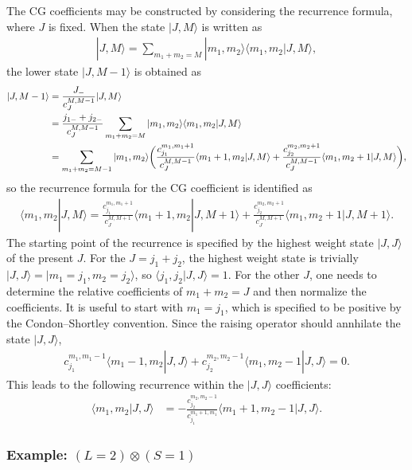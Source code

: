 \documentclass[amsmath,amssymb,prc,aps]{revtex4-2}
\newcommand{\hmath}[1]{\texorpdfstring{$#1$}{#1}}
\begin{document}
The CG coefficients may be constructed by considering the recurrence formula,
where $J$ is fixed.  When the state $|J, M\rangle$ is written as
\begin{align}
  |J, M\rangle = \sum_{m_1+m_2=M} |m_1, m_2\rangle\langle m_1,m_2|J,M\rangle,
\end{align}
the lower state $|J, M-1\rangle$ is obtained as
\begin{align}
  |J, M-1\rangle
    &= \frac{J_-}{c_{J}^{M,M-1}}|J,M\rangle \notag \\
    &= \frac{j_{1-} + j_{2-}}{c_{J}^{M,M-1}} \sum_{m_1+m_2=M} |m_1, m_2\rangle\langle m_1,m_2|J,M\rangle \notag \\
    &= \sum_{m_1+m_2=M-1} |m_1, m_2\rangle
      \biggl(\frac{c_{j_1}^{m_1,m_1+1}}{{c_{J}^{M,M-1}}}\langle m_1+1,m_2|J,M\rangle
      + \frac{c_{j_2}^{m_2,m_2+1}}{{c_{J}^{M,M-1}}}\langle m_1,m_2+1|J,M\rangle\biggr),
\end{align}
so the recurrence formula for the CG coefficient is identified as
\begin{align}
  \langle m_1,m_2|J,M\rangle =
  \frac{c_{j_1}^{m_1,m_1+1}}{{c_{J}^{M,M+1}}}\langle m_1+1,m_2|J,M+1\rangle
      + \frac{c_{j_2}^{m_2,m_2+1}}{{c_{J}^{M,M+1}}}\langle m_1,m_2+1|J,M+1\rangle.
\end{align}
The starting point of the recurrence is specified by the highest weight state
$|J,J\rangle$ of the present $J$.  For the $J=j_1+j_2$, the highest weight
state is trivially $|J,J\rangle = |m_1=j_1,m_2=j_2\rangle$, so $\langle
j_1,j_2|J,J\rangle = 1$.  For the other $J$, one needs to determine the
relative coefficients of $m_1+m_2=J$ and then normalize the coefficients.  It
is useful to start with $m_1=j_1$, which is specified to be positive by the
Condon--Shortley convention.  Since the raising operator should annhilate the
state $|J,J\rangle$,
\begin{align}
  c_{j_1}^{m_1,m_1-1} \langle m_1-1, m_2 | J, J\rangle
  + c_{j_2}^{m_2,m_2-1} \langle m_1, m_2-1 | J, J\rangle = 0.
\end{align}
This leads to the following recurrence within the $|J,J\rangle$ coefficients:
\begin{align}
  \langle m_1, m_2 | J, J\rangle
  &= - \frac{c_{j_2}^{m_2,m_2-1}}{c_{j_1}^{m_1+1,m_1}} \langle m_1+1, m_2-1 | J, J\rangle.
\end{align}

\subsubsection{Example: \hmath{(L=2)\otimes(S=1)}}
\end{document}
